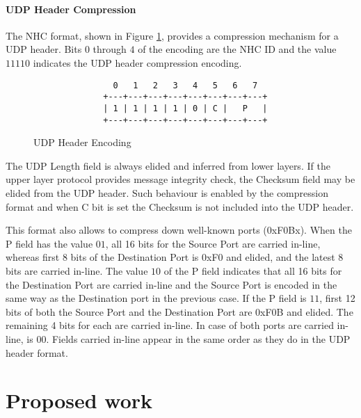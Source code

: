 \documentclass[12pt, titlepage, a4paper]{report}
\newenvironment{mylisting}
{\begin{list}{}{\setlength{\leftmargin}{1em}}\item\footnotesize}
{\end{list}}
\begin{document}
\subsubsection{UDP Header Compression}
The NHC format, shown in Figure \ref{fig:udp.header.enc}, provides a compression mechanism for a UDP header.  Bits $0$ through $4$ of the encoding are the NHC ID and the value $11110$ indicates the UDP header compression encoding.

\begin{figure}[htp]
\begin{mylisting}
\begin{verbatim}
                0   1   2   3   4   5   6   7
              +---+---+---+---+---+---+---+---+
              | 1 | 1 | 1 | 1 | 0 | C |   P   |
              +---+---+---+---+---+---+---+---+
\end{verbatim}
\end{mylisting}
\caption{UDP Header Encoding}\label{fig:udp.header.enc}
\end{figure}

The UDP Length field is always elided and inferred from lower layers. If the upper layer protocol provides message integrity check, the Checksum field may be elided from the UDP header. Such behaviour is enabled by the compression format and when C bit is set the Checksum is not included into the UDP header.

This format also allows to compress down well-known ports (0xF0Bx). When the P field has the value $01$, all 16 bits for the Source Port are carried in-line, whereas first 8 bits of the Destination Port is 0xF0 and elided, and the latest 8 bits are carried in-line. The value $10$ of the P field indicates that all 16 bits for the Destination Port are carried in-line and the Source Port is encoded in the same way as the Destination port in the previous case. If the P field is $11$, first 12 bits of both the Source Port and the Destination Port are 0xF0B and elided. The remaining 4 bits for each are carried in-line. In case of both ports are carried in-line, is $00$. Fields carried in-line appear in the same order as they do in the UDP header format.



\chapter*{Proposed work}

\newpage



\nocite{ieee802.15.4}
\nocite{eui64}
\nocite{rfc780}
\nocite{rfc2460}
\nocite{rfc2464}
\nocite{rfc2474}
\nocite{rfc3168}
\nocite{rfc3775}
\nocite{rfc4191}
\nocite{rfc4291}
\nocite{rfc4443}
\nocite{rfc4861}
\nocite{rfc4862}
\nocite{rfc4919}
\nocite{rfc4944}
\nocite{draft-usecases-05}
\nocite{draft-hc-06}
\nocite{draft-nd-07}
\nocite{draft-routing-04}
\nocite{draft-protocols-07}
\nocite{draft-rpl-04}
\nocite{draft-routing-metrics-04}
\end{document}
